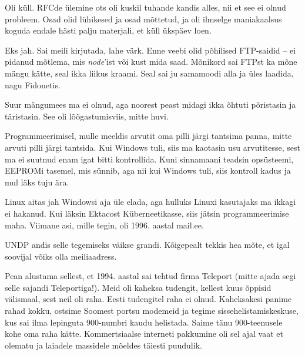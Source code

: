 
Oli küll. RFCde ülemine ots oli kuskil tuhande kandis alles, nii et see ei olnud 
probleem. Osad olid lühikesed ja osad mõttetud, ja oli ilmselge maniakaalsus 
koguda endale hästi palju materjali, et küll ükspäev loen.


Eks jah. Sai meili kirjutada, lahe värk. Enne veebi olid 
põhilised FTP-saidid -- ei pidanud mõtlema, mis \emph{node}'ist või kust 
mida saad. Mõnikord sai FTPst ka mõne mängu kätte, seal ikka liikus kraami. 
Seal sai ju samamoodi alla ja üles laadida, nagu Fidonetis. 


Suur mängumees ma ei olnud, aga noorest peast midagi ikka õhtuti põristasin 
ja täristasin. See oli lõõgastumisviis, mitte huvi. 


Programmeerimisel, mulle meeldis arvutit oma pilli järgi tantsima panna, mitte 
arvuti pilli järgi tantsida. Kui Windows tuli, 
siis ma kaotasin usu arvutitesse, sest ma ei suutnud enam igat 
bitti kontrollida. Kuni sinnamaani teadsin opsüsteemi, EEPROMi 
tasemel, mis sünnib, aga nii kui Windows tuli, siis kontroll kadus ja mul läks tuju ära.


Linux aitas jah Windowsi aja üle elada, aga hulluks 
Linuxi kasutajaks ma ikkagi ei hakanud. Kui läksin 
Ektacost Küberneetikasse, siis jätsin programmeerimise maha. Viimane asi, mille 
tegin, oli 1996. aastal mail.ee. 


UNDP andis selle tegemiseks väikse grandi.
Kõigepealt tekkis hea mõte, et igal soovijal võiks olla meiliaadress. 

Pean alustama sellest, et 1994. aastal sai tehtud 
firma Teleport (mitte ajada segi selle sajandi 
Teleportiga!). Meid oli kaheksa tudengit, kellest kuus õppisid välismaal, sest 
neil oli raha. Eesti tudengitel raha ei olnud. Kaheksakesi panime rahad 
kokku, ostsime Soomest portsu modemeid ja tegime sissehelistamiskeskuse, kus 
sai ilma lepinguta 900-numbri kaudu helistada. Saime 
tänu 900-teenusele kohe oma raha kätte. Kommertsiaalse interneti pakkumine oli sel 
ajal vaat et olematu ja laiadele massidele mõeldes täiesti 
puudulik. 

